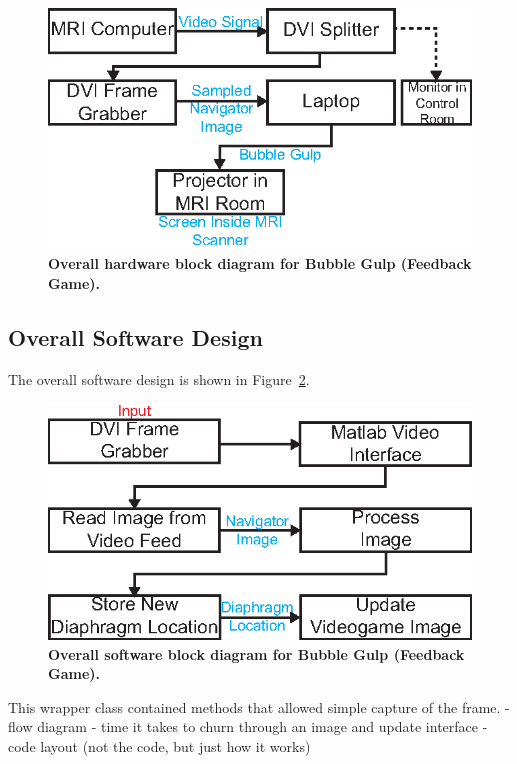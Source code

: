 	\begin{figure}
		\centering
		\includegraphics{figures/gamepaper/07-overallHardwareDiagram}
		\caption[Overall hardware block diagram for Bubble Gulp (Feedback Game)]{\textbf{Overall hardware block diagram for Bubble Gulp (Feedback Game).}}
		\label{fig:hardwareblockdiagram}
	\end{figure}

\subsection{Overall Software Design}
	The overall software design is shown in Figure~\ref{fig:softwareblockdiagram}.
	
	\begin{figure}
		\centering
		\includegraphics{figures/gamepaper/08-overallSoftwareDiagram}
		\caption[Overall software block diagram for Bubble Gulp (Feedback Game)]{\textbf{Overall software block diagram for Bubble Gulp (Feedback Game).}}
		\label{fig:softwareblockdiagram}
	\end{figure}

	This wrapper class contained methods that allowed simple capture of the frame.
- flow diagram
- time it takes to churn through an image and update interface
- code layout (not the code, but just how it works)

